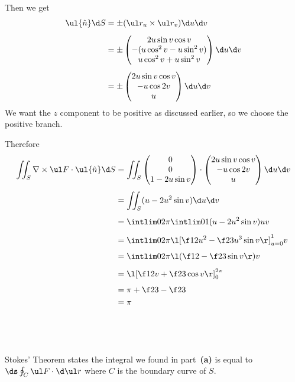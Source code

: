 \documentclass[a4paper]{article}
\begin{document}
Then we get \begin{align*}
\ul{\hat n} \d S &= \pm (\ul r_u \times \ul r_v) \d u \d v\\[1ex]
&= \pm \begin{pmatrix} 2u \sin v \cos v \\ -(u \cos^2 v - u \sin^2 v) \\ u \cos^2 v + u \sin^2 v \end{pmatrix} \d u \d v\\[1ex]
&= \pm \begin{pmatrix} 2u \sin v \cos v \\ -u \cos 2v \\ u \end{pmatrix} \d u \d v
\end{align*}
We want the $z$ component to be positive as discussed earlier, so we choose the positive branch.

Therefore \begin{align*}
\iint_S \nabla \times \ul F \cdot \ul{\hat n} \d S &= \iint_S \begin{pmatrix} 0 \\ 0 \\ 1 - 2u \sin v \end{pmatrix} \cdot \begin{pmatrix} 2u \sin v \cos v \\ -u \cos 2v \\ u \end{pmatrix} \d u \d v\\[1ex]
&= \iint_S (u - 2 u^2 \sin v) \d u \d v\\[1ex]
&= \intlim 0{2\pi} {\intlim 01 {(u - 2 u^2 \sin v)} u} v\\[1ex]
&= \intlim 0{2\pi} {\l[ \f12 u^2 - \f23 u^3 \sin v \r]_{u=0}^1} v\\[1ex]
&= \intlim 0{2\pi} {\l( \f12 - \f23 \sin v \r)} v\\[1ex]
&= \l[ \f12 v + \f23 \cos v \r]_0^{2\pi}\\[1ex]
&= \pi + \f23 - \f23\\
&= \pi
\end{align*}

\subsection{~}

Stokes' Theorem states the integral we found in part~\textbf{(a)} is equal to $\ds \oint_C \ul F \cdot \d \ul r$ where $C$ is the boundary curve of $S$.
\end{document}
